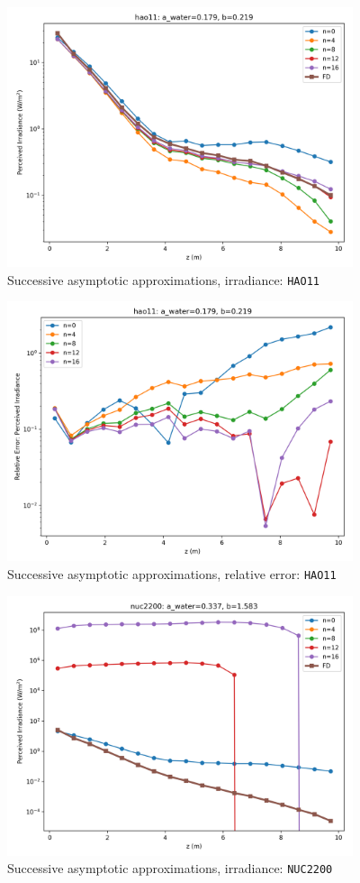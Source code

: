 \documentclass[ms,cpyr,lof,lot]{uathesis}
\begin{document}
\begin{figure}[H]
  \centering
  \includegraphics[width=4in]{asym_conv_irrad_hao11}
  \caption{Successive asymptotic approximations, irradiance: \texttt{HAO11}}
\end{figure}

\begin{figure}[H]
  \centering
  \includegraphics[width=4in]{asym_conv_rel_err_hao11}
  \caption{Successive asymptotic approximations, relative error: \texttt{HAO11}}
\end{figure}


\begin{figure}[H]
  \centering
  \includegraphics[width=4in]{asym_conv_irrad_nuc2200}
  \caption{Successive asymptotic approximations, irradiance: \texttt{NUC2200}}
\end{figure}
\end{document}
